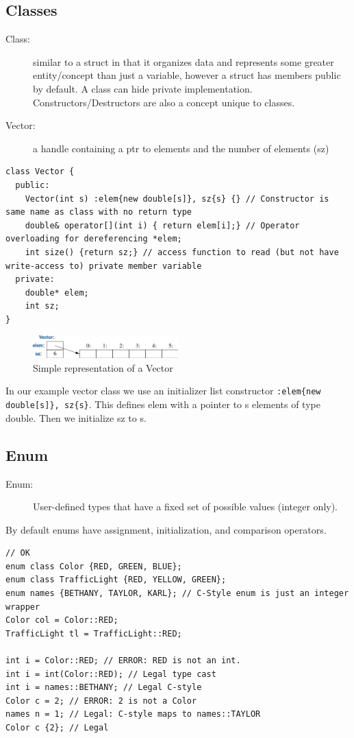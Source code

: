 \documentclass[a4paper, 10pt]{article}
\begin{document}
\subsection{Classes}
\begin{description}
	\item[Class:]
	      similar to a struct in that it organizes data and represents some greater entity/concept than just a variable, however a struct has members public by default. A class can hide private implementation. Constructors/Destructors are also a concept unique to classes.
\end{description}
\begin{description}
	\item[Vector:]
	      a handle containing a ptr to elements and the number of elements (sz)
\end{description}
\begin{lstlisting}[style=cpp]
class Vector {
  public:
    Vector(int s) :elem{new double[s]}, sz{s} {} // Constructor is same name as class with no return type
    double& operator[](int i) { return elem[i];} // Operator overloading for dereferencing *elem;
    int size() {return sz;} // access function to read (but not have write-access to) private member variable
  private:
    double* elem;
    int sz;
}
\end{lstlisting}

\begin{figure}[ht]
	\centering
	\includegraphics[width=0.5\textwidth]{vector.png}
	\caption{Simple representation of a Vector}
\end{figure}

In our example vector class we use an initializer list constructor \verb!:elem{new double[s]}, sz{s}!. This defines elem with a pointer to s elements of type double. Then we initialize sz to s.

\subsection{Enum}
\begin{description}
	\item[Enum:]
	      User-defined types that have a fixed set of possible values (integer only).
\end{description}
By default enums have assignment, initialization, and comparison operators.
\begin{lstlisting}[style=cpp]
// OK
enum class Color {RED, GREEN, BLUE};
enum class TrafficLight {RED, YELLOW, GREEN};
enum names {BETHANY, TAYLOR, KARL}; // C-Style enum is just an integer wrapper
Color col = Color::RED;
TrafficLight tl = TrafficLight::RED;

int i = Color::RED; // ERROR: RED is not an int.
int i = int(Color::RED); // Legal type cast
int i = names::BETHANY; // Legal C-style
Color c = 2; // ERROR: 2 is not a Color
names n = 1; // Legal: C-style maps to names::TAYLOR
Color c {2}; // Legal
\end{lstlisting}
\end{document}
